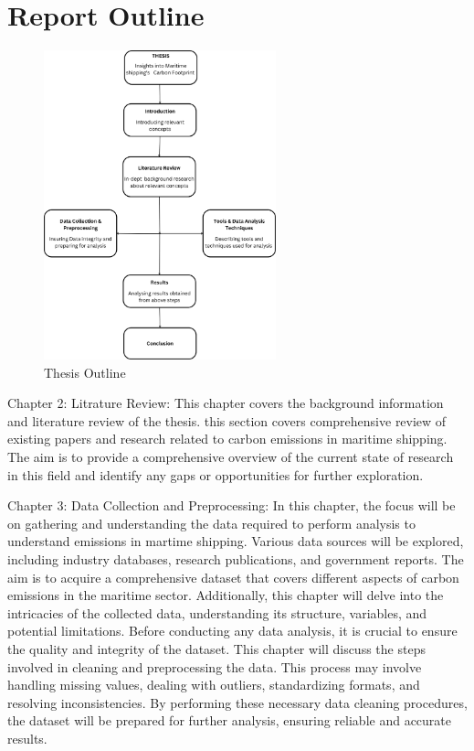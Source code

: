 \section{Report Outline}

\begin{figure}[ht]
    \centering
    \includegraphics[width=0.6\textwidth]{images/thesis_outline.png}
    \caption{Thesis Outline}
    \label{fig:outline}
\end{figure}

\noindent Chapter 2: Litrature Review: This chapter covers the background information and literature review of the thesis.
this section covers comprehensive review of existing papers and research related to carbon emissions in maritime shipping.
The aim is to provide a comprehensive overview of the current state of research in this field and identify any gaps or opportunities for further exploration.


\noindent Chapter 3: Data Collection and Preprocessing:
In this chapter, the focus will be on gathering and understanding the data required to perform analysis to understand emissions in martime shipping.
Various data sources will be explored, including industry databases, research publications, and government reports.
The aim is to acquire a comprehensive dataset that covers different aspects of carbon emissions in the maritime sector.
Additionally, this chapter will delve into the intricacies of the collected data, understanding its structure, variables, and potential limitations.
Before conducting any data analysis, it is crucial to ensure the quality and integrity of the dataset.
This chapter will discuss the steps involved in cleaning and preprocessing the data.
This process may involve handling missing values, dealing with outliers, standardizing formats, and resolving inconsistencies.
By performing these necessary data cleaning procedures, the dataset will be prepared for further analysis, ensuring reliable and accurate results.

